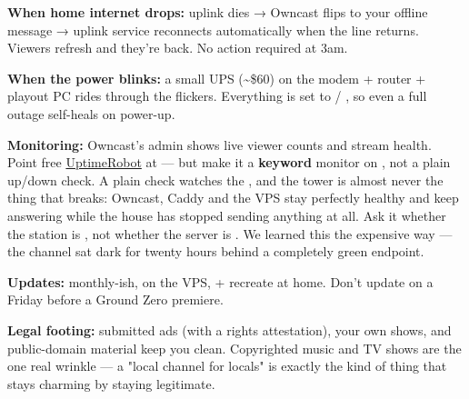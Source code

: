 \documentclass[fontpath=fonts/,logopath=logo/]{riposte-doc}
\begin{document}
\begin{ripbullets}
\item \textbf{When home internet drops:} uplink dies → Owncast flips to your offline message → uplink service reconnects automatically when the line returns. Viewers refresh and they're back. No action required at 3am.
\item \textbf{When the power blinks:} a small UPS (\textasciitilde{}\$60) on the modem + router + playout PC rides through the flickers. Everything is set to  / , so even a full outage self-heals on power-up.
\item \textbf{Monitoring:} Owncast's admin shows live viewer counts and stream health. Point free \href{https://uptimerobot.com}{UptimeRobot} at  — but make it a \textbf{keyword} monitor on , not a plain up/down check. A plain check watches the , and the tower is almost never the thing that breaks: Owncast, Caddy and the VPS stay perfectly healthy and keep answering  while the house has stopped sending anything at all. Ask it whether the station is , not whether the server is . We learned this the expensive way — the channel sat dark for twenty hours behind a completely green endpoint.
\item \textbf{Updates:} monthly-ish,  on the VPS,  + recreate at home. Don't update on a Friday before a Ground Zero premiere.
\item \textbf{Legal footing:} submitted ads (with a rights attestation), your own shows, and public-domain material keep you clean. Copyrighted music and TV shows are the one real wrinkle — a "local channel for locals" is exactly the kind of thing that stays charming by staying legitimate.
\end{ripbullets}


\end{document}
